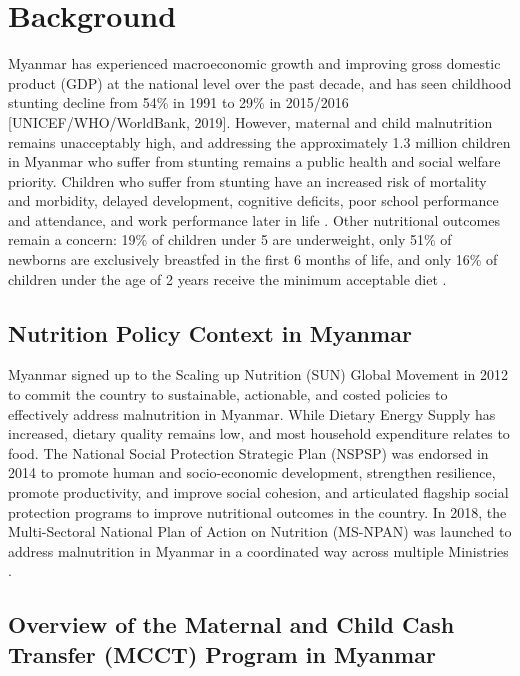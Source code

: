 \documentclass[12pt,a4paper]{article}
\begin{document}
\newpage

\hypertarget{background}{%
\section{Background}\label{background}}

Myanmar has experienced macroeconomic growth and improving gross domestic product (GDP) at the national level over the past decade, and has seen childhood stunting decline from 54\% in 1991 to 29\% in 2015/2016 {[}UNICEF/WHO/WorldBank, 2019{]}. However, maternal and child malnutrition remains unacceptably high, and addressing the approximately 1.3 million children in Myanmar who suffer from stunting remains a public health and social welfare priority. Children who suffer from stunting have an increased risk of mortality and morbidity, delayed development, cognitive deficits, poor school performance and attendance, and work performance later in life \citep{DeOnis2016}. Other nutritional outcomes remain a concern: 19\% of children under 5 are underweight, only 51\% of newborns are exclusively breastfed in the first 6 months of life, and only 16\% of children under the age of 2 years receive the minimum acceptable diet \citep{MinistryofHealthandSports-MoHS/Myanmar2017}.

\hypertarget{nutrition-policy-context-in-myanmar}{%
\subsection{Nutrition Policy Context in Myanmar}\label{nutrition-policy-context-in-myanmar}}

Myanmar signed up to the Scaling up Nutrition (SUN) Global Movement in 2012 to commit the country to sustainable, actionable, and costed policies to effectively address malnutrition in Myanmar. While Dietary Energy Supply has increased, dietary quality remains low, and most household expenditure relates to food. The National Social Protection Strategic Plan (NSPSP) was endorsed in 2014 to promote human and socio-economic development, strengthen resilience, promote productivity, and improve social cohesion, and articulated flagship social protection programs to improve nutritional outcomes in the country. In 2018, the Multi-Sectoral National Plan of Action on Nutrition (MS-NPAN) was launched to address malnutrition in Myanmar in a coordinated way across multiple Ministries \citep{NationalNutritionCentre2018}.

\hypertarget{overview-of-the-maternal-and-child-cash-transfer-mcct-program-in-myanmar}{%
\subsection{Overview of the Maternal and Child Cash Transfer (MCCT) Program in Myanmar}\label{overview-of-the-maternal-and-child-cash-transfer-mcct-program-in-myanmar}}
\end{document}
